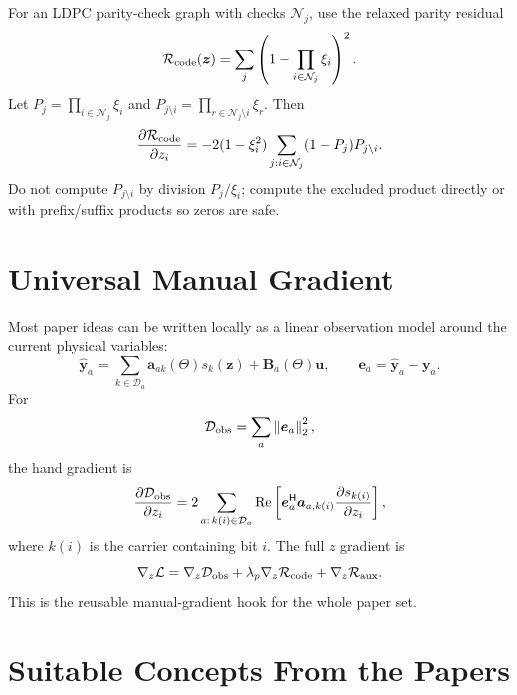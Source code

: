\documentclass[11pt]{article}
\newcommand{\Hh}{^{\mathsf H}}
\newcommand{\norm}[1]{\left\lVert #1 \right\rVert}
\newcommand{\Ree}{\operatorname{Re}}
\begin{document}
For an LDPC parity-check graph with checks $\mathcal N_j$, use the relaxed
parity residual
\begin{equation}
  \mathcal R_{\rm code}(\bm z)
  =
  \sum_j
  \left(1-\prod_{i\in\mathcal N_j}\xi_i\right)^2.
  \label{eq:parity_penalty}
\end{equation}
Let $P_j=\prod_{i\in\mathcal N_j}\xi_i$ and
$P_{j\setminus i}=\prod_{r\in\mathcal N_j\setminus i}\xi_r$.  Then
\begin{equation}
  \frac{\partial \mathcal R_{\rm code}}{\partial z_i}
  =
  -2(1-\xi_i^2)
  \sum_{j:i\in\mathcal N_j}
  (1-P_j)P_{j\setminus i}.
  \label{eq:parity_gradient}
\end{equation}
Do not compute $P_{j\setminus i}$ by division $P_j/\xi_i$; compute the
excluded product directly or with prefix/suffix products so zeros are safe.

\section{Universal Manual Gradient}

Most paper ideas can be written locally as a linear observation model around
the current physical variables:
\begin{equation}
  \widehat{\bm y}_a
  =
  \sum_{k\in\mathcal D_a}\bm a_{ak}(\Theta)s_k(\bm z)
  +\bm B_a(\Theta)\bm u,
  \qquad
  \bm e_a=\widehat{\bm y}_a-\bm y_a .
  \label{eq:local_model}
\end{equation}
For
\begin{equation}
  \mathcal D_{\rm obs}=\sum_a \norm{\bm e_a}_2^2,
\end{equation}
the hand gradient is
\begin{equation}
  \frac{\partial \mathcal D_{\rm obs}}{\partial z_i}
  =
  2\sum_{a:\,k(i)\in\mathcal D_a}
  \Ree\left[
    \bm e_a\Hh \bm a_{a,k(i)}
    \frac{\partial s_{k(i)}}{\partial z_i}
  \right],
  \label{eq:universal_z_gradient}
\end{equation}
where $k(i)$ is the carrier containing bit $i$.  The full $z$ gradient is
\begin{equation}
  \nabla_z\mathcal L
  =
  \nabla_z\mathcal D_{\rm obs}
  +\lambda_p\nabla_z\mathcal R_{\rm code}
  +\nabla_z\mathcal R_{\rm aux}.
  \label{eq:full_z_gradient}
\end{equation}
This is the reusable manual-gradient hook for the whole paper set.

\section{Suitable Concepts From the Papers}
\end{document}

